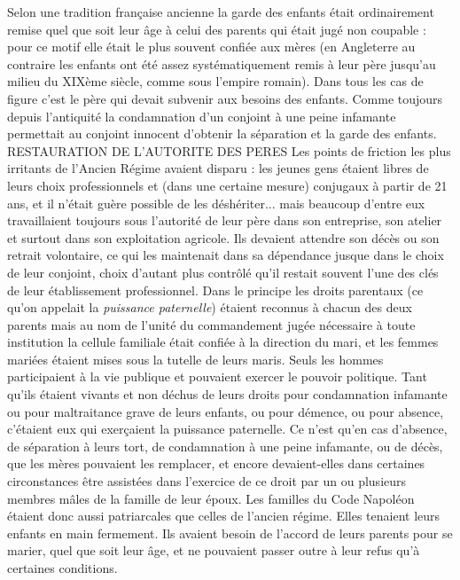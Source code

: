  Selon une tradition française ancienne la garde des enfants était ordinairement remise quel que soit leur âge à celui des parents qui était jugé non coupable : pour ce motif elle était le plus souvent confiée aux mères (en Angleterre au contraire les enfants ont été assez systématiquement remis à leur père jusqu'au milieu du XIXème siècle, comme sous l'empire romain). Dans tous les cas de figure c'est le père qui devait subvenir aux besoins des enfants. Comme toujours depuis l'antiquité la condamnation d'un conjoint à une peine infamante permettait au conjoint innocent d'obtenir la séparation et la garde des enfants.
RESTAURATION DE L'AUTORITE DES PERES
 Les points de friction les plus irritants de l'Ancien Régime avaient disparu : les jeunes gens étaient libres de leurs choix professionnels et (dans une certaine mesure) conjugaux à partir de 21 ans, et il n'était guère possible de les déshériter... mais beaucoup d'entre eux travaillaient toujours sous l'autorité de leur père dans son entreprise, son atelier et surtout dans son exploitation agricole. Ils devaient attendre son décès ou son retrait volontaire, ce qui les maintenait dans sa dépendance jusque dans le choix de leur conjoint, choix d'autant plus contrôlé qu'il restait souvent l'une des clés de leur établissement professionnel. 
 Dans le principe les droits parentaux (ce qu'on appelait la \emph{puissance paternelle}) étaient reconnus à chacun des deux parents mais au nom de l'unité du commandement jugée nécessaire à toute institution la cellule familiale était confiée à la direction du mari, et les femmes mariées étaient mises sous la tutelle de leurs maris. Seuls les hommes participaient à la vie publique et pouvaient exercer le pouvoir politique. Tant qu'ils étaient vivants et non déchus de leurs droits pour condamnation infamante ou pour maltraitance grave de leurs enfants, ou pour démence, ou pour absence, c'étaient eux qui exerçaient la puissance paternelle. Ce n'est qu'en cas d'absence, de séparation à leurs tort, de condamnation à une peine infamante, ou de décès, que les mères pouvaient les remplacer, et encore devaient-elles dans certaines circonstances être assistées dans l'exercice de ce droit par un ou plusieurs membres mâles de la famille de leur époux. Les familles du Code Napoléon étaient donc aussi patriarcales que celles de l'ancien régime. Elles tenaient leurs enfants en main fermement. Ils avaient besoin de l'accord de leurs parents pour se marier, quel que soit leur âge, et ne pouvaient passer outre à leur refus qu'à certaines conditions. 
